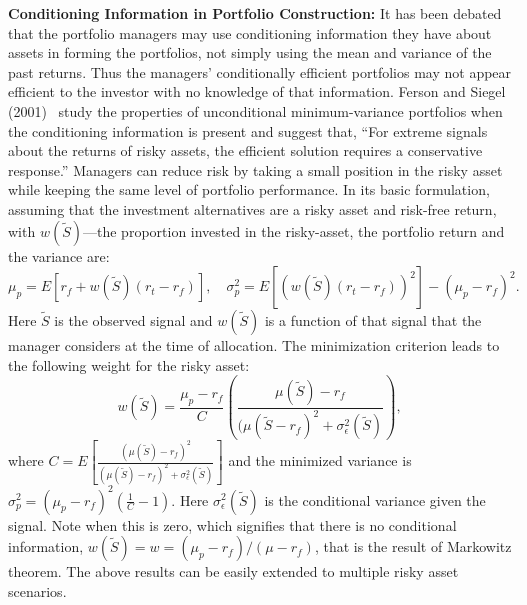\noindent\textbf{Conditioning Information in Portfolio Construction:} It has been debated that the portfolio managers may use conditioning information they have about assets in forming the portfolios, not simply using the mean and variance of the past returns. Thus the managers' conditionally efficient portfolios may not appear efficient to the investor with no knowledge of that information. Ferson and Siegel (2001)~\cite{fersie} study the properties of unconditional minimum-variance portfolios when the conditioning information is present and suggest that, ``For extreme signals about the returns of risky assets, the efficient solution requires a conservative response.'' Managers can reduce risk by taking a small position in the risky asset while keeping the same level of portfolio performance. In its basic formulation, assuming that the investment alternatives are a risky asset and risk-free return, with $w(\tilde{S})$---the proportion invested in the risky-asset, the portfolio return and the variance are: 
	\begin{equation} \label{eqn:preturnvar}
	\mu_p= E[r_f+w(\tilde{S})(r_t-r_f)], \quad \sigma_p^2= E[(w(\tilde{S})(r_t - r_f))^2] - (\mu_p - r_f)^2.
	\end{equation}
Here $\tilde{S}$ is the observed signal and $w(\tilde{S})$ is a function of that signal that the manager considers at the time of allocation. The minimization criterion leads to the following weight for the risky asset:
	\begin{equation} \label{eqn:riskyassetweight}
	w(\tilde{S})= \dfrac{\mu_p - r_f}{C} \left( \dfrac{\mu(\tilde{S}) - r_f}{(\mu(\tilde{S} - r_f)^2 + \sigma^2_\epsilon(\tilde{S})} \right),
	\end{equation}
where $C= E\left[ \frac{(\mu(\tilde{S}) - r_f)^2}{(\mu(\tilde{S}) - r_f)^2 + \sigma^2_\epsilon(\tilde{S})} \right]$ and the minimized variance is ${\sigma_p^2=(\mu_p - r_f)^2 \left( \frac{1}{C} - 1 \right)}$. Here $\sigma_\epsilon^2(\tilde{S})$ is the conditional variance given the signal. Note when this is zero, which signifies that there is no conditional information, $w(\tilde{S})= w= (\mu_p - r_f)/(\mu - r_f)$, that is the result of Markowitz theorem. The above results can be easily extended to multiple risky asset scenarios.


